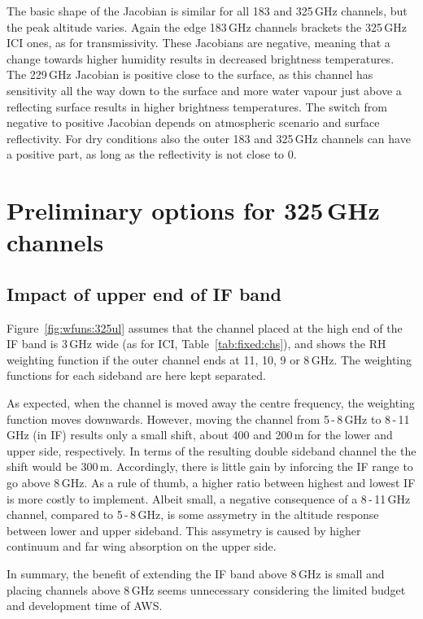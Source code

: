 \documentclass[12pt]{article}
\begin{document}
The basic shape of the Jacobian is similar for all 183 and 325\,GHz channels,
but the peak altitude varies. Again the edge 183\,GHz channels brackets the
325\,GHz ICI ones, as for transmissivity. These Jacobians are negative, meaning
that a change towards higher humidity results in decreased brightness
temperatures. The 229\,GHz Jacobian is positive close to the surface, as this
channel has sensitivity all the way down to the surface and more water vapour
just above a reflecting surface results in higher brightness temperatures. The
switch from negative to positive Jacobian depends on atmospheric scenario and
surface reflectivity. For dry conditions also the outer 183 and 325\,GHz
channels can have a positive part, as long as the reflectivity is not close to
0.


\section{Preliminary options for 325\,GHz channels}

\subsection{Impact of upper end of IF band}
%
Figure~\ref{fig:wfuns:325ul} assumes that the channel placed at the high end of
the IF band is 3\,GHz wide (as for ICI, Table~\ref{tab:fixed:chs}), and shows
the RH weighting function if the outer channel ends at 11, 10, 9 or 8\,GHz. The
weighting functions for each sideband are here kept separated.


As expected, when the channel is moved away the centre frequency, the weighting
function moves downwards. However, moving the channel from 5\,-\,8\,GHz to
8\,-\,11\,GHz (in IF) results only a small shift, about 400 and 200\,m for the
lower and upper side, respectively. In terms of the resulting double sideband
channel the the shift would be 300\,m. Accordingly, there is little gain by
inforcing the IF range to go above 8\,GHz. As a rule of thumb, a higher ratio
between highest and lowest IF is more costly to implement. Albeit small, a
negative consequence of a 8\,-\,11\,GHz channel, compared to 5\,-\,8\,GHz, is
some assymetry in the altitude response between lower and upper sideband. This
assymetry is caused by higher continuum and far wing absorption on the upper
side.

In summary, the benefit of extending the IF band above 8\,GHz is small and
placing channels above 8\,GHz seems unnecessary considering the limited budget
and development time of AWS.
\end{document}
